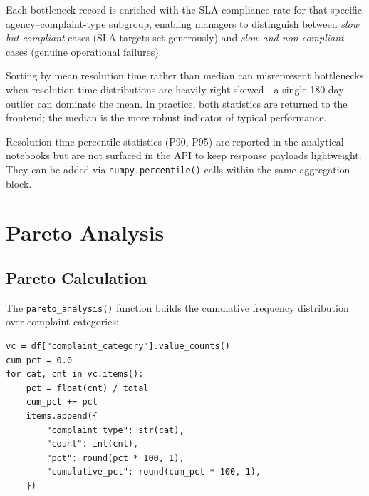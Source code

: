 Each bottleneck record is enriched with the SLA compliance rate for that specific agency--complaint-type subgroup, enabling managers to distinguish between \emph{slow but compliant} cases (SLA targets set generously) and \emph{slow and non-compliant} cases (genuine operational failures).

\begin{keyinsight}
Sorting by mean resolution time rather than median can misrepresent bottlenecks when resolution time distributions are heavily right-skewed---a single 180-day outlier can dominate the mean. In practice, both statistics are returned to the frontend; the median is the more robust indicator of typical performance.
\end{keyinsight}

Resolution time percentile statistics (P90, P95) are reported in the analytical notebooks but are not surfaced in the API to keep response payloads lightweight. They can be added via \texttt{numpy.percentile()} calls within the same aggregation block.

\section{Pareto Analysis}
\label{sec:ops-pareto}


\subsection{Pareto Calculation}

The \texttt{pareto\_analysis()} function builds the cumulative frequency distribution over complaint categories:

\begin{lstlisting}[style=python, caption={Pareto accumulation in \texttt{ops\_engine.py}}, label=lst:pareto-calc]
vc = df["complaint_category"].value_counts()
cum_pct = 0.0
for cat, cnt in vc.items():
    pct = float(cnt) / total
    cum_pct += pct
    items.append({
        "complaint_type": str(cat),
        "count": int(cnt),
        "pct": round(pct * 100, 1),
        "cumulative_pct": round(cum_pct * 100, 1),
    })
\end{lstlisting}

